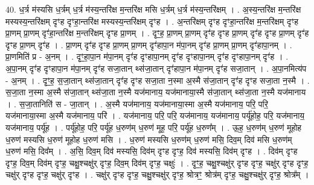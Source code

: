 \documentclass[17pt]{extarticle}
\begin{document}
40. ध॒र्त्र म॑स्यसि ध॒र्त्रम् ध॒र्त्र म॑स्य॒न्तरि॑क्ष म॒न्तरि॑क्ष मसि ध॒र्त्रम् ध॒र्त्र म॑स्य॒न्तरि॑क्षम् । . अ॒स्य॒न्तरि॑क्ष म॒न्तरि॑क्ष मस्यस्य॒न्तरि॑क्षम् दृꣳह दृꣳहा॒न्तरि॑क्ष मस्यस्य॒न्तरि॑क्षम् दृꣳह । . अ॒न्तरि॑क्षम् दृꣳह दृꣳहा॒न्तरि॑क्ष म॒न्तरि॑क्षम् दृꣳह प्रा॒णम् प्रा॒णम् दृꣳ॑हा॒न्तरि॑क्ष म॒न्तरि॑क्षम् दृꣳह प्रा॒णम् । . दृꣳ॒॒ह॒ प्रा॒णम् प्रा॒णम् दृꣳ॑ह दृꣳह प्रा॒णम् दृꣳ॑ह दृꣳह प्रा॒णम् दृꣳ॑ह दृꣳह प्रा॒णम् दृꣳ॑ह । . प्रा॒णम् दृꣳ॑ह दृꣳह प्रा॒णम् प्रा॒णम् दृꣳ॑हापा॒न म॑पा॒नम् दृꣳ॑ह प्रा॒णम् प्रा॒णम् दृꣳ॑हापा॒नम् । . प्रा॒णमिति॑ प्र - अ॒नम् । . दृꣳ॒॒हा॒पा॒न म॑पा॒नम् दृꣳ॑ह दृꣳहापा॒नम् दृꣳ॑ह दृꣳहापा॒नम् दृꣳ॑ह दृꣳहापा॒नम् दृꣳ॑ह । . अ॒पा॒नम् दृꣳ॑ह दृꣳहापा॒न म॑पा॒नम् दृꣳ॑ह सजा॒तान् थ्स॑जा॒तान् दृꣳ॑हापा॒न म॑पा॒नम् दृꣳ॑ह सजा॒तान् । . अ॒पा॒नमित्य॑प - अ॒नम् । . दृꣳ॒॒ह॒ स॒जा॒तान् थ्स॑जा॒तान् दृꣳ॑ह दृꣳह सजा॒ता न॒स्मा अ॒स्मै स॑जा॒तान् दृꣳ॑ह दृꣳह सजा॒ता न॒स्मै । . स॒जा॒ता न॒स्मा अ॒स्मै स॑जा॒तान् थ्स॑जा॒ता न॒स्मै यज॑मानाय॒ यज॑मानाया॒स्मै स॑जा॒तान् थ्स॑जा॒ता न॒स्मै यज॑मानाय । . स॒जा॒तानिति॑ स - जा॒तान् । . अ॒स्मै यज॑मानाय॒ यज॑मानाया॒स्मा अ॒स्मै यज॑मानाय॒ परि॒ परि॒ यज॑मानाया॒स्मा अ॒स्मै यज॑मानाय॒ परि॑ । . यज॑मानाय॒ परि॒ परि॒ यज॑मानाय॒ यज॑मानाय॒ पर्यू॑होह॒ परि॒ यज॑मानाय॒ यज॑मानाय॒ पर्यू॑ह । . पर्यू॑होह॒ परि॒ पर्यू॑ह ध॒रुण॑म् ध॒रुण॑ मूह॒ परि॒ पर्यू॑ह ध॒रुण᳚म् । . ऊ॒ह॒ ध॒रुण॑म् ध॒रुण॑ मूहोह ध॒रुण॑ मस्यसि ध॒रुण॑ मूहोह ध॒रुण॑ मसि । . ध॒रुण॑ मस्यसि ध॒रुण॑म् ध॒रुण॑ मसि॒ दिव॒म् दिव॑ मसि ध॒रुण॑म् ध॒रुण॑ मसि॒ दिव᳚म् । . अ॒सि॒ दिव॒म् दिव॑ मस्यसि॒ दिव॑म् दृꣳह दृꣳह॒ दिव॑ मस्यसि॒ दिव॑म् दृꣳह । . दिव॑म् दृꣳह दृꣳह॒ दिव॒म् दिव॑म् दृꣳह॒ चक्षु॒श्चक्षु॑र् दृꣳह॒ दिव॒म् दिव॑म् दृꣳह॒ चक्षुः॑ । . दृꣳ॒॒ह॒ चक्षु॒श्चक्षु॑र् दृꣳह दृꣳह॒ चक्षु॑र् दृꣳह दृꣳह॒ चक्षु॑र् दृꣳह दृꣳह॒ चक्षु॑र् दृꣳह । . चक्षु॑र् दृꣳह दृꣳह॒ चक्षु॒श्चक्षु॑र् दृꣳह॒ श्रोत्रꣳ॒॒ श्रोत्र॑म् दृꣳह॒ चक्षु॒श्चक्षु॑र् दृꣳह॒ श्रोत्र᳚म् । \newline
\pagebreak
{}
\end{document}
